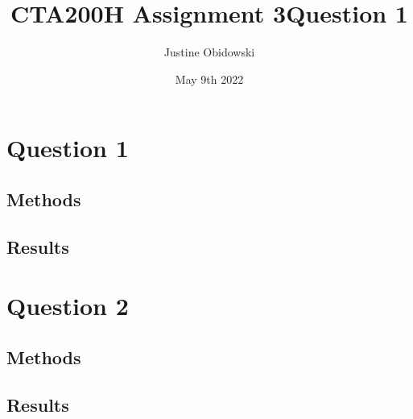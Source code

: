 \documentclass{article}
\title{CTA200H Assignment 3}
\author{Justine Obidowski}
\date{May 9th 2022}
\begin{document}
\maketitle

\section{Question 1}
\subsection{Methods}
\subsection{Results}

\section{Question 2}
\subsection{Methods}
\subsection{Results}

\newpage
\begin{center}
 {\title{Question 1}}
\end{center}

\noindent{}
\end{document}
